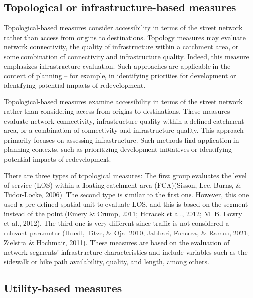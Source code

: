 \documentclass[12pt,twoside]{reedthesis}
\begin{document}
\hypertarget{topological-or-infrastructure-based-measures}{%
\subsection{Topological or infrastructure-based measures}\label{topological-or-infrastructure-based-measures}}

Topological-based measures consider accessibility in terms of the street network rather than access from origins to destinations. Topology measures may evaluate network connectivity, the quality of infrastructure within a catchment area, or some combination of connectivity and infrastructure quality. Indeed, this measure emphasizes infrastructure evaluation. Such approaches are applicable in the context of planning -- for example, in identifying priorities for development or identifying potential impacts of redevelopment.

Topological-based measures examine accessibility in terms of the street network rather than considering access from origins to destinations. These measures evaluate network connectivity, infrastructure quality within a defined catchment area, or a combination of connectivity and infrastructure quality. This approach primarily focuses on assessing infrastructure. Such methods find application in planning contexts, such as prioritizing development initiatives or identifying potential impacts of redevelopment.

There are three types of topological measures: The first group evaluates the level of service (LOS) within a floating catchment area (FCA)(Sisson, Lee, Burns, \& Tudor-Locke, 2006). The second type is similar to the first one. However, this one used a pre-defined spatial unit to evaluate LOS, and this is based on the segment instead of the point (Emery \& Crump, 2011; Horacek et al., 2012; M. B. Lowry et al., 2012). The third one is very different since traffic is not considered a relevant parameter (Hoedl, Titze, \& Oja, 2010; Jabbari, Fonseca, \& Ramos, 2021; Zielstra \& Hochmair, 2011). These measures are based on the evaluation of network segments' infrastructure characteristics and include variables such as the sidewalk or bike path availability, quality, and length, among others.

\hypertarget{utility-based-measures}{%
\subsection{Utility-based measures}\label{utility-based-measures}}
\end{document}
